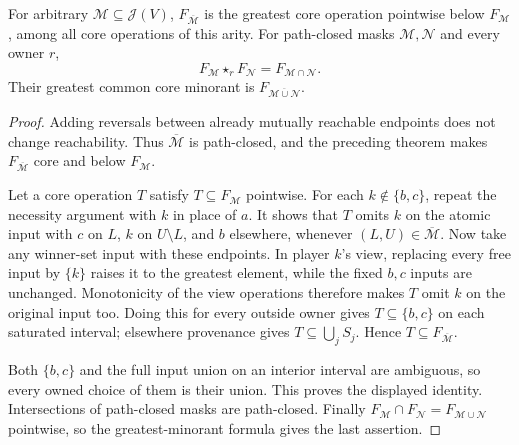 \begin{corollary}\label{core:cor:interval-mask-interior}
For arbitrary $\mathcal M\subseteq\mathcal J(V)$,
$F_{\overline{\mathcal M}}$ is the greatest core operation pointwise
below $F_{\mathcal M}$, among all core operations of this arity.
For path-closed masks $\mathcal M,\mathcal N$ and every owner $r$,
\[
 F_{\mathcal M}\star_r F_{\mathcal N}=F_{\mathcal M\cap\mathcal N}.
\]
Their greatest common core minorant is
$F_{\overline{\mathcal M\cup\mathcal N}}$.
\end{corollary}
\begin{proof}
Adding reversals between already mutually reachable endpoints does not
change reachability. Thus $\overline{\mathcal M}$ is path-closed, and
the preceding theorem makes $F_{\overline{\mathcal M}}$ core and below
$F_{\mathcal M}$.

Let a core operation $T$ satisfy $T\subseteq F_{\mathcal M}$ pointwise.
For each $k\notin\{b,c\}$, repeat the necessity argument with $k$ in
place of $a$. It shows that $T$ omits $k$ on the atomic input with $c$
on $L$, $k$ on $U\setminus L$, and $b$ elsewhere, whenever
$(L,U)\in\overline{\mathcal M}$. Now take any winner-set input with
these endpoints. In player $k$'s view, replacing every free input by
$\{k\}$ raises it to the greatest element, while the fixed $b,c$
inputs are unchanged. Monotonicity of the view operations therefore
makes $T$ omit $k$ on the original input too. Doing this for every
outside owner gives $T\subseteq\{b,c\}$ on each saturated interval;
elsewhere provenance gives $T\subseteq\bigcup_jS_j$. Hence
$T\subseteq F_{\overline{\mathcal M}}$.

Both $\{b,c\}$ and the full input union on an interior interval are
ambiguous, so every owned choice of them is their union. This proves
the displayed identity. Intersections of path-closed masks are
path-closed. Finally
$F_{\mathcal M}\cap F_{\mathcal N}=F_{\mathcal M\cup\mathcal N}$
pointwise, so the greatest-minorant formula gives the last assertion.
\end{proof}

